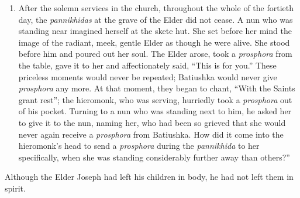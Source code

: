 \begin{enumerate}
\item After the solemn services in the church, throughout the whole of the fortieth day, the \textit{pannikhidas} at the grave of the Elder did not cease. A nun who was standing near imagined herself at the skete hut. She set before her mind the image of the radiant, meek, gentle Elder as though he were alive. She stood before him and poured out her soul. The Elder arose, took a \textit{prosphora} from the table, gave it to her and affectionately said, “This is for you.” These priceless moments would never be repeated; Batiushka would never give \textit{prosphora} any more. At that moment, they began to chant, “With the Saints grant rest”; the hieromonk, who was serving, hurriedly took a \textit{prosphora} out of his pocket. Turning to a nun who was standing next to him, he asked her to give it to the nun, naming her, who had been so grieved that she would never again receive a \textit{prosphora} from Batiushka. How did it come into the hieromonk's head to send a \textit{prosphora} during the \textit{pannikhida} to her specifically, when she was standing considerably further away than others?”
\end{enumerate}

Although the Elder Joseph had left his children in body, he had not left them in spirit.